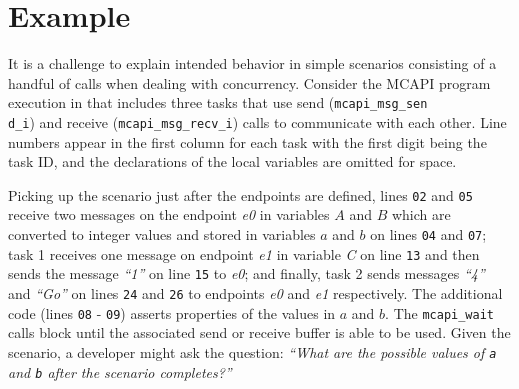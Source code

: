 \section{Example}

It is a challenge to explain intended behavior in simple scenarios
consisting of a handful of calls when dealing with concurrency. Consider
the MCAPI program execution in  that includes three
tasks that use send (\texttt{mcapi\_msg\_sen\\d\_i}) and receive
(\texttt{mcapi\_msg\_recv\_i}) calls to communicate with each other.
Line numbers appear in the first column for each task with the first digit being the task ID, and the
declarations of the local variables are omitted for space. 

Picking up
the scenario just after the endpoints are defined, lines \texttt{02}
and \texttt{05} receive two messages on the endpoint
\textit{e0} in variables $A$ and $B$ which are
converted to integer values and stored in variables $a$ and
$b$ on lines \texttt{04} and \texttt{07}; task 1 receives one
message on endpoint \textit{e1} in variable \textit{C} on line
\texttt{13} and then sends the message \textit{``1''} on line \texttt{15} to
\textit{e0}; and finally, task 2 sends messages \textit{``4''} and \textit{``Go''} on
lines \texttt{24} and \texttt{26} to endpoints \textit{e0} and
\textit{e1} respectively. The additional code (lines \texttt{08} -
\texttt{09}) asserts properties of the values in $a$ and
$b$. The \texttt{mcapi\_wait} calls block until the associated
send or receive buffer is able to be used. Given the scenario, a developer
might ask the question: \emph{``What are the possible values of
\texttt{a} and \texttt{b} after the scenario completes?''}

